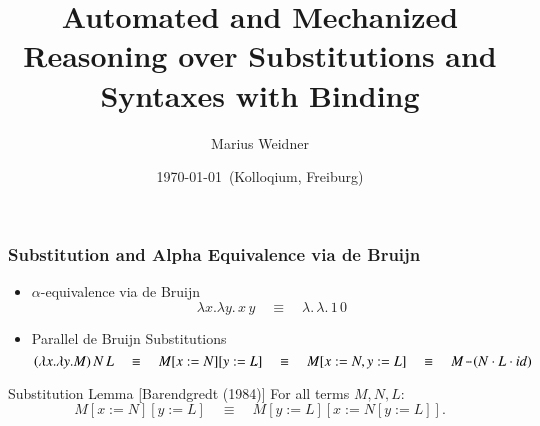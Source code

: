 \documentclass[dvipsnames,aspectratio=169,pdftex]{beamer}
\title{Automated and Mechanized Reasoning over Substitutions and Syntaxes with Binding}
\author{Marius Weidner}
\institute{University of Freiburg}
\date{\today \ (Kolloqium, Freiburg)}
\newcommand{\Tdot}{\mkern2mu {\cdotp} \mkern-2mu  {\cdotp} \mkern-2mu {\cdotp} \mkern1mu}
\begin{document}
\begin{frame}{\null}
  \titlepage{}
\end{frame}

\begin{frame}[fragile]
  \frametitle{Substitution and Alpha Equivalence via de Bruijn}
  \begin{itemize}
    \item $\alpha$-equivalence via de Bruijn
          \[
            \lambda x. \lambda y.\,x \,y \quad\equiv\quad \lambda.\,\lambda.\,1\,0
          \]

    \item Parallel de Bruijn Substitutions
          \[
            (\lambda x. \lambda y. M)\,N\,L \quad\equiv\quad M[x := N][y := L]  \quad \equiv\quad M[x := N, y := L] \quad\equiv\quad M \Tdot (N \cdot L \cdot id)
          \]
  \end{itemize}

  \vspace{0.6em}
  \begin{block}{Substitution Lemma [Barendgredt (1984)]}
    For all terms $M, N, L$:
    \[
      M[x := N][y := L] \quad\equiv\quad M[y := L][x := N[y := L]]. %
    \]
  \end{block}
\end{frame}

\end{document}
